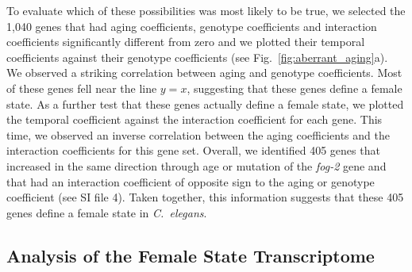 \documentclass[10pt,letterpaper,twocolumn]{article}
\newcommand{\cel}{\emph{C.~elegans}}
\newcommand{\fog}{\emph{\mbox{fog-2}}}
\newcommand{\intersectn}{1,040}
\newcommand{\femalen}{405}
\newcommand{\ra}[1]{\renewcommand{\arraystretch}{#1}}
\begin{document}
To evaluate which of these possibilities was most likely to be true, we selected
the \intersectn{} genes that had aging coefficients, genotype coefficients and
interaction coefficients significantly different from zero and we plotted their
temporal coefficients against their genotype coefficients (see
Fig.~\ref{fig:aberrant_aging}a). We observed a striking correlation between
aging and genotype coefficients. Most of these genes fell near the line $y=x$,
suggesting that these genes define a female state. As a further test that these
genes actually define a female state, we plotted the temporal coefficient
against the interaction coefficient for each gene.
This time, we observed an inverse correlation between the aging coefficients
and the interaction coefficients for this gene set. Overall, we identified
\femalen{} genes that increased in the same direction through age or mutation
of the \fog{} gene and that had an interaction coefficient of opposite sign to
the aging or genotype coefficient (see SI file 4). Taken together, this
information suggests that these \femalen{} genes define a female state in
\cel{}.

\subsection*{Analysis of the Female State Transcriptome}
\end{document}
